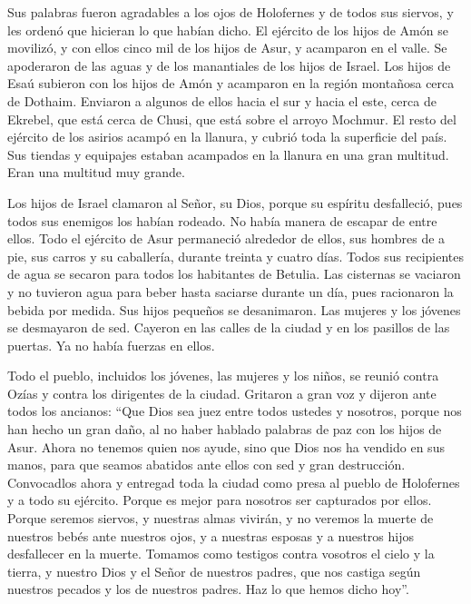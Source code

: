  Sus palabras fueron agradables a los ojos de Holofernes
y de todos sus siervos, y les ordenó que hicieran lo que habían dicho.
 El ejército de los hijos de Amón se movilizó, y con
ellos cinco mil de los hijos de Asur, y acamparon en el valle. Se
apoderaron de las aguas y de los manantiales de los hijos de Israel.
 Los hijos de Esaú subieron con los hijos de Amón y
acamparon en la región montañosa cerca de Dothaim. Enviaron a algunos de
ellos hacia el sur y hacia el este, cerca de Ekrebel, que está cerca de
Chusi, que está sobre el arroyo Mochmur. El resto del ejército de los
asirios acampó en la llanura, y cubrió toda la superficie del país. Sus
tiendas y equipajes estaban acampados en la llanura en una gran
multitud. Eran una multitud muy grande.

 Los hijos de Israel clamaron al Señor, su Dios, porque
su espíritu desfalleció, pues todos sus enemigos los habían rodeado. No
había manera de escapar de entre ellos.  Todo el ejército
de Asur permaneció alrededor de ellos, sus hombres de a pie, sus carros
y su caballería, durante treinta y cuatro días. Todos sus recipientes de
agua se secaron para todos los habitantes de Betulia. 
Las cisternas se vaciaron y no tuvieron agua para beber hasta saciarse
durante un día, pues racionaron la bebida por medida. 
Sus hijos pequeños se desanimaron. Las mujeres y los jóvenes se
desmayaron de sed. Cayeron en las calles de la ciudad y en los pasillos
de las puertas. Ya no había fuerzas en ellos.

 Todo el pueblo, incluidos los jóvenes, las mujeres y los
niños, se reunió contra Ozías y contra los dirigentes de la ciudad.
Gritaron a gran voz y dijeron ante todos los ancianos: 
``Que Dios sea juez entre todos ustedes y nosotros, porque nos han hecho
un gran daño, al no haber hablado palabras de paz con los hijos de Asur.
 Ahora no tenemos quien nos ayude, sino que Dios nos ha
vendido en sus manos, para que seamos abatidos ante ellos con sed y gran
destrucción.  Convocadlos ahora y entregad toda la ciudad
como presa al pueblo de Holofernes y a todo su ejército. 
Porque es mejor para nosotros ser capturados por ellos. Porque seremos
siervos, y nuestras almas vivirán, y no veremos la muerte de nuestros
bebés ante nuestros ojos, y a nuestras esposas y a nuestros hijos
desfallecer en la muerte.  Tomamos como testigos contra
vosotros el cielo y la tierra, y nuestro Dios y el Señor de nuestros
padres, que nos castiga según nuestros pecados y los de nuestros padres.
Haz lo que hemos dicho hoy''.

